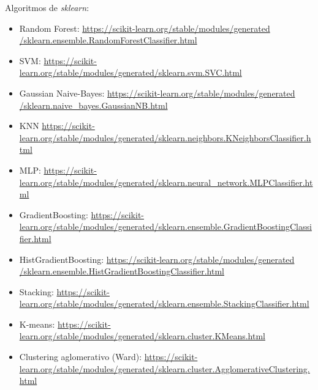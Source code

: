 \documentclass{article}
\begin{document}
Algoritmos de \textit{sklearn}:
\begin{itemize}

\item Random Forest: \href{https://scikit-learn.org/stable/modules/generated/sklearn.ensemble.RandomForestClassifier.html}{https://scikit-learn.org/stable/modules/generated\\/sklearn.ensemble.RandomForestClassifier.html}
\item SVM: \href{https://scikit-learn.org/stable/modules/generated/sklearn.svm.SVC.html}{https://scikit-learn.org/stable/modules/generated/sklearn.svm.SVC.html}
\item Gaussian Naive-Bayes: \href{https://scikit-learn.org/stable/modules/generated/sklearn.naive_bayes.GaussianNB.html}{https://scikit-learn.org/stable/modules/generated\\/sklearn.naive\_bayes.GaussianNB.html}
\item KNN \href{https://scikit-learn.org/stable/modules/generated/sklearn.neighbors.KNeighborsClassifier.html}{https://scikit-learn.org/stable/modules/generated/sklearn.neighbors.KNeighborsClassifier.html}
\item MLP: \href{https://scikit-learn.org/stable/modules/generated/sklearn.neural_network.MLPClassifier.html}{https://scikit-learn.org/stable/modules/generated/sklearn.neural\_network.MLPClassifier.html}
\item GradientBoosting: \href{https://scikit-learn.org/stable/modules/generated/sklearn.ensemble.GradientBoostingClassifier.html}{https://scikit-learn.org/stable/modules/generated/sklearn.ensemble.GradientBoostingClassifier.html}
\item HistGradientBoosting: \href{https://scikit-learn.org/stable/modules/generated/sklearn.ensemble.HistGradientBoostingClassifier.html}{https://scikit-learn.org/stable/modules/generated\\/sklearn.ensemble.HistGradientBoostingClassifier.html}
\item Stacking: \href{https://scikit-learn.org/stable/modules/generated/sklearn.ensemble.StackingClassifier.html}{https://scikit-learn.org/stable/modules/generated/sklearn.ensemble.StackingClassifier.html}
\item K-means: \href{https://scikit-learn.org/stable/modules/generated/sklearn.cluster.KMeans.html}{https://scikit-learn.org/stable/modules/generated/sklearn.cluster.KMeans.html}
\item Clustering aglomerativo (Ward):
  \href{https://scikit-learn.org/stable/modules/generated/sklearn.cluster.AgglomerativeClustering.html}{https://scikit-learn.org/stable/modules/generated/sklearn.cluster.AgglomerativeClustering.html}
\end{itemize}
\end{document}
